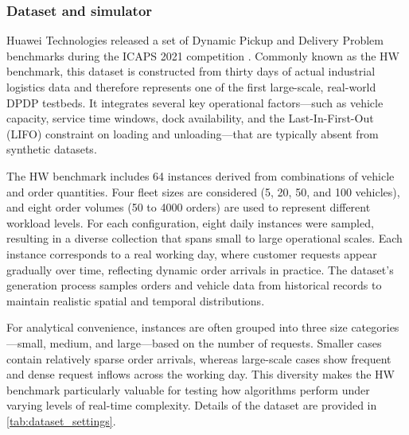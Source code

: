 \documentclass[preprint,12pt]{elsarticle}
\begin{document}
\subsubsection{Dataset and simulator} \label{ss:exp-data}


 Huawei Technologies released a set of Dynamic Pickup and Delivery Problem benchmarks during the ICAPS 2021 competition \cite{hao2022introduction}. Commonly known as the HW benchmark, this dataset is constructed from thirty days of actual industrial logistics data and therefore represents one of the first large-scale, real-world DPDP testbeds. It integrates several key operational factors—such as vehicle capacity, service time windows, dock availability, and the Last-In-First-Out (LIFO) constraint on loading and unloading—that are typically absent from synthetic datasets.

The HW benchmark includes 64 instances derived from combinations of vehicle and order quantities. Four fleet sizes are considered (5, 20, 50, and 100 vehicles), and eight order volumes (50 to 4000 orders) are used to represent different workload levels. For each configuration, eight daily instances were sampled, resulting in a diverse collection that spans small to large operational scales. Each instance corresponds to a real working day, where customer requests appear gradually over time, reflecting dynamic order arrivals in practice. The dataset’s generation process samples orders and vehicle data from historical records to maintain realistic spatial and temporal distributions.

For analytical convenience, instances are often grouped into three size categories—small, medium, and large—based on the number of requests. Smaller cases contain relatively sparse order arrivals, whereas large-scale cases show frequent and dense request inflows across the working day. This diversity makes the HW benchmark particularly valuable for testing how algorithms perform under varying levels of real-time complexity. Details of the dataset are provided in \autoref{tab:dataset_settings}.
\end{document}
